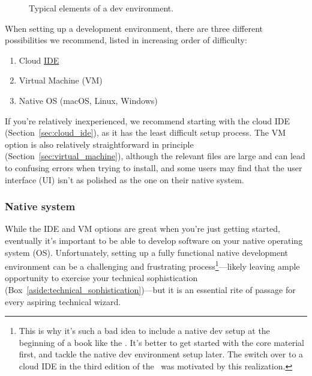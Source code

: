 \begin{figure}
\begin{center}
\end{center}
\caption{Typical elements of a dev environment.\label{fig:dev_environment}}
\end{figure}

When setting up a development environment, there are three different possibilities we recommend, listed in increasing order of difficulty:

\begin{enumerate}
  \item Cloud \href{https://en.wikipedia.org/wiki/Integrated_development_environment}{IDE}
  \item Virtual Machine (VM)
  \item Native OS (macOS, Linux, Windows)
\end{enumerate}

If you're relatively inexperienced, we recommend starting with the cloud IDE (Section~\ref{sec:cloud_ide}), as it has the least difficult setup process. The VM option is also relatively straightforward in principle (Section~\ref{sec:virtual_machine}), although the relevant files are large and can lead to confusing errors when trying to install, and some users may find that the user interface (UI) isn't as polished as the one on their native system.

\subsubsection{Native system} %
\label{sec:native_system}

While the IDE and VM options are great when you're just getting started, eventually it's important to be able to develop software on your native operating system (OS)\@. Unfortunately, setting up a fully functional native development environment can be a challenging and frustrating process\footnote{This is why it's such a bad idea to include a native dev setup at the beginning of a book like the \rortb. It's better to get started with the core material first, and tackle the native dev environment setup later. The switch over to a cloud IDE in the third edition of the \rortb\ was motivated by this realization.}---likely leaving ample opportunity to exercise your technical sophistication (Box~\ref{aside:technical_sophistication})---but it is an essential rite of passage for every aspiring technical wizard.

